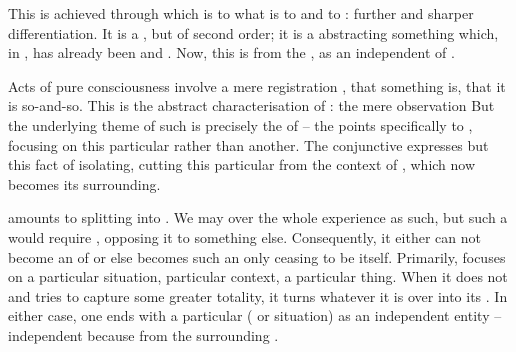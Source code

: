 This is achieved through  which is to  what
 is to  and  to :
further and sharper differentiation.  It is a , but of second
order; it is a  abstracting something which, in ,
has already been  and . Now, this is
 from the ,  as an independent
 of .

Acts of pure  consciousness involve a mere registration
, that something is, that it is so-and-so.  This is the abstract
characterisation of : the mere observation  But the
underlying theme of such  is precisely the  of
 -- the   points specifically to , focusing on
this particular   rather than another.  The conjunctive 
expresses but this fact of isolating, {cutting} this particular   from
the context of , which now becomes its surrounding.


\pa\label{pa:attentive}  amounts to splitting 
into . We may  over the whole experience as such,
but such a  would require  ,
opposing it to something else. Consequently, it either can not become an
 of  or else becomes such an  only ceasing
to be itself.  Primarily,  focuses on a particular situation,
particular context, a particular thing. When it does not and tries to capture
some greater totality, it turns whatever it is  over into its
. In either case, one ends with a particular ( or 
situation)  as an independent entity -- independent because
 from the surrounding .


